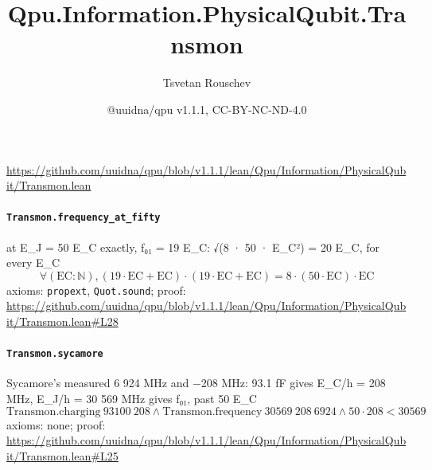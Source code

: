 \documentclass[11pt]{article}
\title{Qpu.Information.PhysicalQubit.Transmon}
\author{Tsvetan Rouschev}
\date{@uuidna/qpu v1.1.1, CC-BY-NC-ND-4.0}
\begin{document}
\maketitle
\noindent\url{https://github.com/uuidna/qpu/blob/v1.1.1/lean/Qpu/Information/PhysicalQubit/Transmon.lean}

\paragraph{\texttt{Transmon.frequency\_at\_fifty}}
at E\_J = 50 E\_C exactly, f₀₁ = 19 E\_C: √(8 · 50 · E\_C²) = 20 E\_C, for every E\_C
\[ \forall (\mathrm{EC} : \mathbb{N}), (19 \cdot \mathrm{EC} + \mathrm{EC}) \cdot (19 \cdot \mathrm{EC} + \mathrm{EC}) = 8 \cdot (50 \cdot \mathrm{EC}) \cdot \mathrm{EC} \]
\noindent axioms: \texttt{propext}, \texttt{Quot.sound}; proof: \url{https://github.com/uuidna/qpu/blob/v1.1.1/lean/Qpu/Information/PhysicalQubit/Transmon.lean\#L28}

\paragraph{\texttt{Transmon.sycamore}}
Sycamore's measured 6 924 MHz and −208 MHz: 93.1 fF gives E\_C/h = 208 MHz, E\_J/h = 30 569 MHz gives f₀₁, past 50 E\_C
\[ \mathrm{Transmon.charging}\ 93100\ 208 \land \mathrm{Transmon.frequency}\ 30569\ 208\ 6924 \land 50 \cdot 208 < 30569 \]
\noindent axioms: none; proof: \url{https://github.com/uuidna/qpu/blob/v1.1.1/lean/Qpu/Information/PhysicalQubit/Transmon.lean\#L25}
\end{document}
